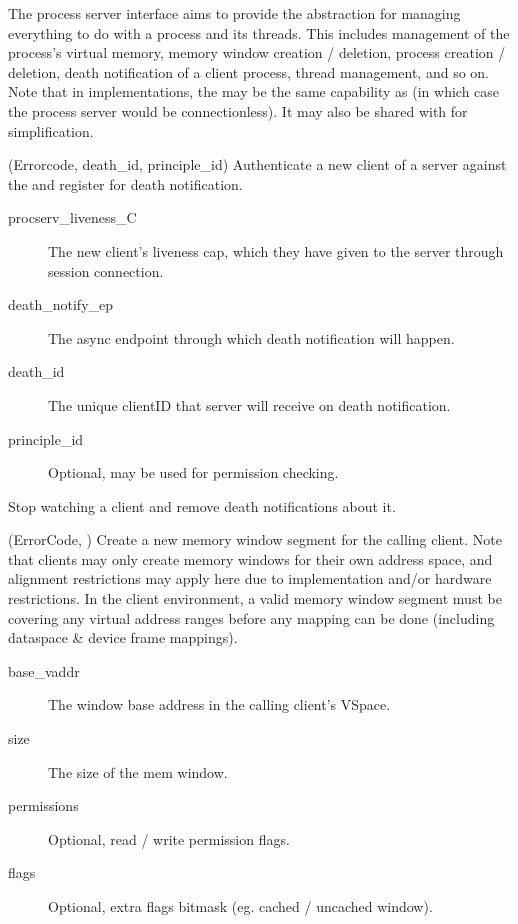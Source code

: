 The process server interface aims to provide the abstraction for managing everything to do with a
process and its threads. This includes management of the process's virtual memory, memory window
creation / deletion, process creation / deletion, death notification of a client process, thread
management, and so on. Note that in implementations, the  may be the same
capability as  (in which case the process server would be connectionless).
It may also be shared with  for simplification.

\begin{description}
	\item {} 
	   {(Errorcode, death\_id, principle\_id)}   
    Authenticate a new client of a server against the  and register for death
    notification.
    \begin{description}
        \item [procserv\_liveness\_C] The new client's liveness cap, which they have given to the
                server through session connection.
        \item [death\_notify\_ep] The async endpoint through which death notification will happen.
        \item [death\_id] The unique clientID that server will receive on death notification.
        \item [principle\_id] Optional, may be used for permission checking.
    \end{description}

    \item {}
    Stop watching a client and remove death notifications about it.

	\item {}
	   {(ErrorCode, )}
	Create a new memory window segment for the calling client.
	Note that clients may only create memory windows for their own address space, and alignment
	restrictions may apply here due to implementation and/or hardware restrictions. In the 
    client environment, a valid memory window segment must be covering any virtual address ranges
    before any mapping can be done (including dataspace \& device frame mappings).
    \begin{description}
        \item [base\_vaddr] The window base address in the calling client's VSpace.
        \item [size] The size of the mem window.
        \item [permissions] Optional, read / write permission flags.
        \item [flags] Optional, extra flags bitmask (eg. cached / uncached window).
    \end{description}


\end{description}
